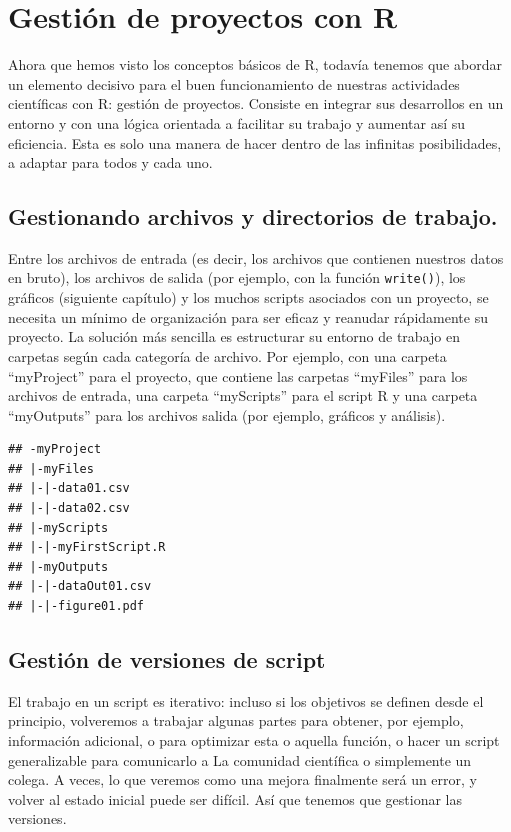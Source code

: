 \documentclass[
]{book}
\begin{document}
\hypertarget{project}{%
\chapter{Gestión de proyectos con R}\label{project}}

Ahora que hemos visto los conceptos básicos de R, todavía tenemos que abordar un elemento decisivo para el buen funcionamiento de nuestras actividades científicas con R: gestión de proyectos. Consiste en integrar sus desarrollos en un entorno y con una lógica orientada a facilitar su trabajo y aumentar así su eficiencia. Esta es solo una manera de hacer dentro de las infinitas posibilidades, a adaptar para todos y cada uno.

\hypertarget{gestionando-archivos-y-directorios-de-trabajo.}{%
\section{Gestionando archivos y directorios de trabajo.}\label{gestionando-archivos-y-directorios-de-trabajo.}}

Entre los archivos de entrada (es decir, los archivos que contienen nuestros datos en bruto), los archivos de salida (por ejemplo, con la función \texttt{write()}), los gráficos (siguiente capítulo) y los muchos scripts asociados con un proyecto, se necesita un mínimo de organización para ser eficaz y reanudar rápidamente su proyecto. La solución más sencilla es estructurar su entorno de trabajo en carpetas según cada categoría de archivo. Por ejemplo, con una carpeta ``myProject'' para el proyecto, que contiene las carpetas ``myFiles'' para los archivos de entrada, una carpeta ``myScripts'' para el script R y una carpeta ``myOutputs'' para los archivos salida (por ejemplo, gráficos y análisis).

\begin{verbatim}
## -myProject
## |-myFiles
## |-|-data01.csv
## |-|-data02.csv
## |-myScripts
## |-|-myFirstScript.R
## |-myOutputs
## |-|-dataOut01.csv
## |-|-figure01.pdf
\end{verbatim}

\hypertarget{gestiuxf3n-de-versiones-de-script}{%
\section{Gestión de versiones de script}\label{gestiuxf3n-de-versiones-de-script}}

El trabajo en un script es iterativo: incluso si los objetivos se definen desde el principio, volveremos a trabajar algunas partes para obtener, por ejemplo, información adicional, o para optimizar esta o aquella función, o hacer un script generalizable para comunicarlo a La comunidad científica o simplemente un colega. A veces, lo que veremos como una mejora finalmente será un error, y volver al estado inicial puede ser difícil. Así que tenemos que gestionar las versiones.
\end{document}

